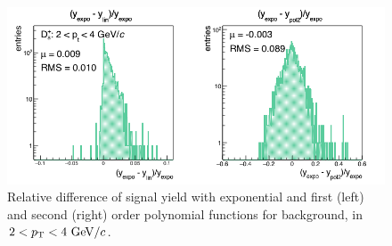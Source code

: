 \begin{figure}[!hb]
\begin{center}
 \includegraphics[width=.70\textwidth]{FigCap4/studyBkg_Free_pt0.png}
\caption{Relative difference of signal yield with exponential and first (left) and second (right) 
order polynomial functions for background, in $2 < p_{\rm T} < 4 ~\mathrm{GeV}/c$.}             
\label{fig:diffBkgPt0}
\end{center}
\end{figure}


